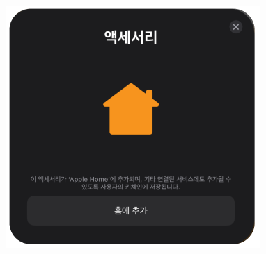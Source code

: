 \documentclass[conference]{IEEEtran}
\begin{document}
\begin{enumerate}[label=\arabic*.]
\begin{figure}[H]\centering \includegraphics[scale=0.5]{images/sw-spec-10.png}\end{figure}


\end{enumerate}
\end{document}
